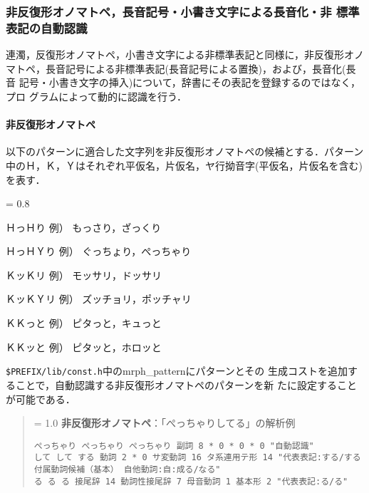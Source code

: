 \documentclass[a4j,titlepage]{jarticle}
\begin{document}
\subsubsection{非反復形オノマトペ，長音記号・小書き文字による長音化・非
   標準表記の自動認識}

連濁，反復形オノマトペ，小書き文字による非標準表記と同様に，非反復形オノ
マトペ，長音記号による非標準表記(長音記号による置換)，および，長音化(長音
記号・小書き文字の挿入)について，辞書にその表記を登録するのではなく，プロ
グラムによって動的に認識を行う．

\noindent
\paragraph{非反復形オノマトペ}
以下のパターンに適合した文字列を非反復形オノマトペの候補とする．パターン
中のＨ，Ｋ，Ｙはそれぞれ平仮名，片仮名，ヤ行拗音字(平仮名，片仮名を含む)
を表す．

\begin{itemize}
{\baselineskip = 0.8 \baselineskip
 \item ＨっＨり   \hspace{2em}例） もっさり，ざっくり
 \item ＨっＨＹり \hspace{1em}例） ぐっちょり，ぺっちゃり
 \item ＫッＫリ   \hspace{2em}例） モッサリ，ドッサリ
 \item ＫッＫＹリ \hspace{1em}例） ズッチョリ，ポッチャリ
 \item ＫＫっと   \hspace{2em}例） ピタっと，キュっと
 \item ＫＫッと   \hspace{2em}例） ピタッと，ホロッと
}
\end{itemize}

\noindent \texttt{\$PREFIX/lib/const.h}中のmrph\_patternにパターンとその
生成コストを追加することで，自動認識する非反復形オノマトペのパターンを新
たに設定することが可能である．

\begin{quote}
{\baselineskip = 1.0 \baselineskip
{\bf 非反復形オノマトペ}：「ぺっちゃりしてる」の解析例\vspace{-2ex}
\begin{verbatim}
ぺっちゃり ぺっちゃり ぺっちゃり 副詞 8 * 0 * 0 * 0 "自動認識"
して して する 動詞 2 * 0 サ変動詞 16 タ系連用テ形 14 "代表表記:する/する 付属動詞候補（基本） 自他動詞:自:成る/なる"
る る る 接尾辞 14 動詞性接尾辞 7 母音動詞 1 基本形 2 "代表表記:る/る"
\end{verbatim}
}
\end{quote}
\end{document}
